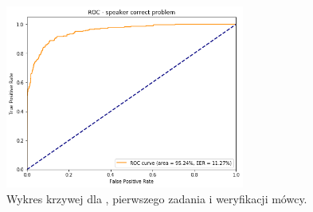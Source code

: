 \begin{figure}[H]
        \centering
        \includegraphics[width=0.7\textwidth]{images/4_3_hmm_roc_speaker}
        \caption{Wykres krzywej  dla , pierwszego zadania  i weryfikacji mówcy.}
        \label{fig:4_3_hmm_roc_speaker}
\end{figure}

